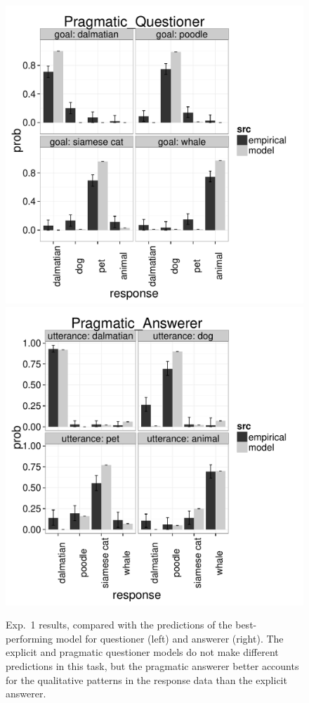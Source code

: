 \documentclass[12pt, floatsintext, man]{apa6}
\begin{document}
	\begin{figure}[t!]
\begin{center}
\includegraphics[scale = .4]{Exp1PragmaticQuestioner.pdf}
\includegraphics[scale = .4]{Exp1PragmaticAnswerer.pdf}
\end{center}
\vspace{-.5cm}
\caption{Exp.~1 results, compared with the predictions of the best-performing model  for questioner (left) and answerer (right).  The explicit and pragmatic questioner models do not make different predictions in this task, but the pragmatic answerer better accounts for the qualitative patterns in the response data than the explicit answerer.}
\vspace{-.1cm}
\label{fig:exp1res}
\end{figure}
\end{document}
